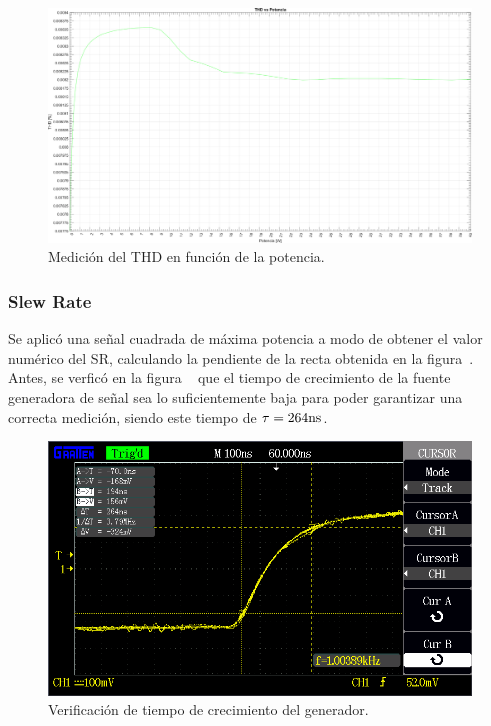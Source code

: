 \begin{figure}[H]
    \centering
    \includegraphics[width=0.95 \textwidth, angle=90]{img/simulaciones/THD/THD_vs_power_sim.png}
    \caption{Medición del THD en función de la potencia.}
    \label{fig:Sensitivity}
\end{figure}

\subsubsection{Slew Rate}

Se aplicó una señal cuadrada de máxima potencia a modo de obtener el valor numérico del SR, calculando la pendiente de la recta obtenida en la figura~. Antes, se verficó en la figura  ~ que el tiempo de crecimiento de la fuente generadora de señal sea lo suficientemente baja para poder garantizar una correcta medición, siendo este tiempo de $\tau = 264 \si[per-mode=symbol]{\nano\second}$.


\begin{figure}[H]
        \centering
        \includegraphics[width=0.95 \textwidth]{./img/mediciones/Slew_Rate/1.png}
        \caption{Verificación de tiempo de crecimiento del generador.}
        \label{fig:Slew_rate_gen}
\end{figure}

